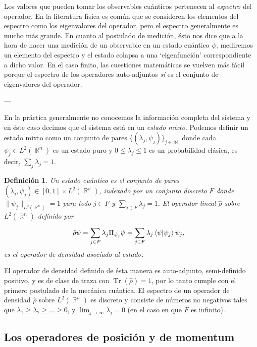 \documentclass[a4paper]{report}
\DeclareMathOperator{\R}{\mathbb{R}}
\DeclareMathOperator{\N}{\mathbb{N}}
\DeclareMathOperator{\Tr}{Tr}
\newtheorem{definition}{Definición}
\begin{document}
  Los valores que pueden tomar los observables cuánticos
  pertenecen al \textit{espectro} del operador. En la
  literatura física es común que se consideren los elementos
  del espectro como los eigenvalores del operador, pero el
  espectro generalmente es mucho más grande. En cuanto al
  postulado de medición, ésto nos dice que a la hora de
  hacer una medición de un observable en un estado cuántico
  $\psi$, mediremos un elemento del espectro y el estado
  colapsa a una `eigenfunción' correspondiente a dicho
  valor. En el caso finito, las cuestiones matemáticas se
  vuelven más fácil porque el espectro de los operadores
  auto-adjuntos \textit{sí} es el conjunto de eigenvalores
  del operador.

  ---

  En la práctica generalmente no conocemos la
  información completa del sistema y en éste caso decimos
  que el sistema está en un \textit{estado mixto}. Podemos
  definir un estado mixto como un conjunto de pares
  $\{(\lambda_j,\psi_j)\}_{j \in \N}$ donde cada $\psi_j \in
  L^2(\R^{n})$ es un estado puro y $0 \leq \lambda_j \leq 1$
  es un probabilidad clásica, es decir, $\sum_j \lambda_j =
  1$.

  \begin{definition}
    Un estado cuántico es el conjunto de pares $(\lambda_j,
    \psi_j) \in [0,1] \times L^2(\R^{n})$, indexado por un
    conjunto discreto $F$ donde $\|\psi_j\|_{L^2(\R^{n})} =
    1$ para todo $j \in F$ y $\sum_{j \in F} \lambda_j = 1$.
    El operador lineal $\hat{\rho}$ sobre $L^2(\R^{n})$
    definido por
    \begin{equation}
      \hat{\rho} \psi
      = \sum_{j \in F}^{} \lambda_j \Pi_{\psi_j} \psi
      = \sum_{j \in F}^{} \lambda_j \braket{\psi| \psi_j}
      \psi_j,
    \end{equation}
    es el operador de densidad asociado al estado. 
  \end{definition}
  El operador de densidad definido de ésta manera es
  auto-adjunto, semi-definido positivo, y es de clase de
  traza con $\Tr(\hat{\rho}) = 1$, por lo tanto cumple con
  el primero postulado de la mecánica cuántica. El espectro
  de un operador de densidad $\hat{\rho}$ sobre
  $L^2(\R^{n})$ es discreto y consiste de números no
  negativos tales que $\lambda_1 \geq \lambda_2 \geq \ldots
  \geq 0$, y $\lim_{j \to \infty} \lambda_j = 0$ (en el caso
  en que $F$ es infinito).
  
  \subsection{Los operadores de posición y de momentum}
\end{document}
